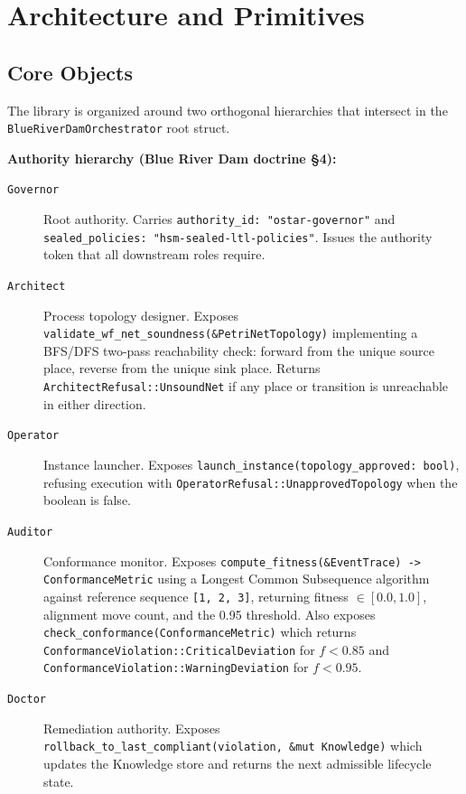 
\section{Architecture and Primitives}
\label{sec:blue-river-dam-architecture}

\subsection{Core Objects}
\label{sec:blue-river-dam-architecture-objects}

The library is organized around two orthogonal hierarchies that intersect
in the \texttt{BlueRiverDamOrchestrator} root struct.

\textbf{Authority hierarchy (Blue River Dam doctrine §4):}
\begin{description}
  \item[\texttt{Governor}] Root authority. Carries \texttt{authority\_id:
    "ostar-governor"} and \texttt{sealed\_policies: "hsm-sealed-ltl-policies"}.
    Issues the authority token that all downstream roles require.
  \item[\texttt{Architect}] Process topology designer. Exposes
    \texttt{validate\_wf\_net\_soundness(\&PetriNetTopology)} implementing a
    BFS/DFS two-pass reachability check: forward from the unique source place,
    reverse from the unique sink place. Returns \texttt{ArchitectRefusal::UnsoundNet}
    if any place or transition is unreachable in either direction.
  \item[\texttt{Operator}] Instance launcher. Exposes
    \texttt{launch\_instance(topology\_approved: bool)}, refusing execution with
    \texttt{OperatorRefusal::UnapprovedTopology} when the boolean is false.
  \item[\texttt{Auditor}] Conformance monitor. Exposes
    \texttt{compute\_fitness(\&EventTrace) -> ConformanceMetric} using a
    Longest Common Subsequence algorithm against reference sequence
    \texttt{[1, 2, 3]}, returning fitness $\in [0.0, 1.0]$, alignment move
    count, and the 0.95 threshold.  Also exposes
    \texttt{check\_conformance(ConformanceMetric)} which returns
    \texttt{ConformanceViolation::CriticalDeviation} for $f < 0.85$ and
    \texttt{ConformanceViolation::WarningDeviation} for $f < 0.95$.
  \item[\texttt{Doctor}] Remediation authority. Exposes
    \texttt{rollback\_to\_last\_compliant(violation, \&mut Knowledge)} which
    updates the Knowledge store and returns the next admissible lifecycle state.
\end{description}


